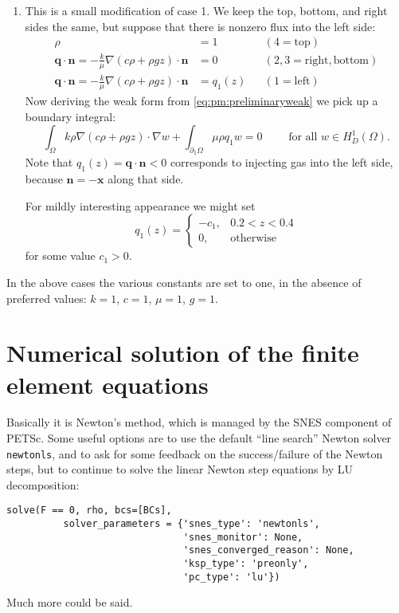 \documentclass[11pt]{article}
\newcommand{\bn}{\mathbf{n}}
\newcommand{\bq}{\mathbf{q}}
\newcommand{\bx}{\mathbf{x}}
\newcommand{\grad}{\nabla}
\begin{document}
\begin{enumerate}
\item This is a small modification of case 1.  We keep the top, bottom, and right sides the same, but suppose that there is nonzero flux into the left side:
\begin{subequations}
\begin{align}
\rho &= 1 & &(4=\text{top}) \label{eq:twobc:dirichlet} \\
\bq \cdot \bn = - \frac{k}{\mu} \grad(c\rho + \rho g z) \cdot \bn &= 0 & &(2,3=\text{right},\text{bottom}) \label{eq:twobc:noflux} \\
\bq \cdot \bn = - \frac{k}{\mu} \grad(c\rho + \rho g z) \cdot \bn &= q_1(z) & &(1=\text{left}) \label{eq:twobc:givenflux}
\end{align}
\end{subequations}
Now deriving the weak form from \eqref{eq:pm:preliminaryweak} we pick up a boundary integral:
\begin{equation}
\int_\Omega k \rho \grad\left(c\rho + \rho g z\right) \cdot \grad w + \int_{\partial_1\Omega} \mu \rho q_1 w = 0 \qquad \text{ for all } w \in H_D^1(\Omega).\label{eq:pm:weaktwo}
\end{equation}
Note that $q_1(z) = \bq \cdot \bn < 0$ corresponds to injecting gas into the left side, because $\bn = -\bx$ along that side.

For mildly interesting appearance we might set
	$$q_1(z) = \begin{cases} -c_1, & 0.2 < z < 0.4 \\ 0, & \text{otherwise} \end{cases}$$
for some value $c_1>0$.
\end{enumerate}

In the above cases the various constants are set to one, in the absence of preferred values: $k=1$, $c=1$, $\mu=1$, $g=1$.



\section{Numerical solution of the finite element equations}

Basically it is Newton's method, which is managed by the SNES component of PETSc.  Some useful options are to use the default ``line search'' Newton solver \texttt{newtonls}, and to ask for some feedback on the success/failure of the Newton steps, but to continue to solve the linear Newton step equations by LU decomposition:
\begin{Verbatim}[fontsize=\small]
    solve(F == 0, rho, bcs=[BCs],
          solver_parameters = {'snes_type': 'newtonls',
                               'snes_monitor': None,
                               'snes_converged_reason': None,
                               'ksp_type': 'preonly',
                               'pc_type': 'lu'})
\end{Verbatim}
Much more could be said.
\end{document}
